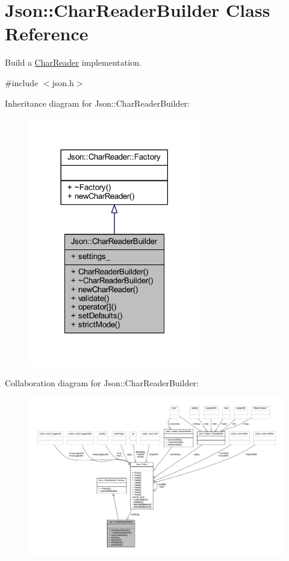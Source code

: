 \hypertarget{class_json_1_1_char_reader_builder}{}\section{Json\+:\+:Char\+Reader\+Builder Class Reference}
\label{class_json_1_1_char_reader_builder}


Build a \hyperlink{class_json_1_1_char_reader}{Char\+Reader} implementation.  




{\ttfamily \#include $<$json.\+h$>$}



Inheritance diagram for Json\+:\+:Char\+Reader\+Builder\+:\nopagebreak
\begin{figure}[H]
\begin{center}
\leavevmode
\includegraphics[width=213pt]{class_json_1_1_char_reader_builder__inherit__graph}
\end{center}
\end{figure}


Collaboration diagram for Json\+:\+:Char\+Reader\+Builder\+:\nopagebreak
\begin{figure}[H]
\begin{center}
\leavevmode
\includegraphics[width=350pt]{class_json_1_1_char_reader_builder__coll__graph}
\end{center}
\end{figure}
